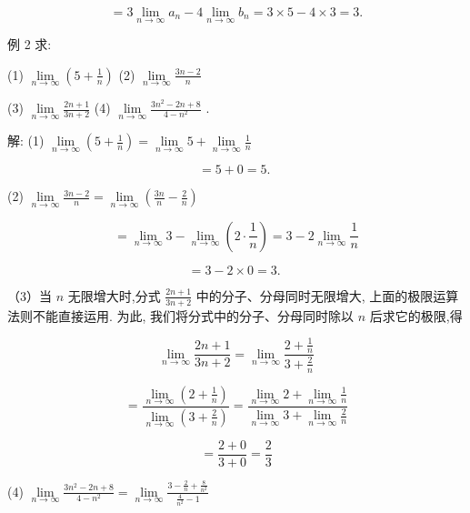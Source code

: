 \documentclass[lang=cn,newtx,10pt,scheme=chinese]{elegantbook}
\begin{document}
\[
= 3\mathop{\lim }\limits_{{n \rightarrow \infty }}{a}_{n} - 4\mathop{\lim }\limits_{{n \rightarrow \infty }}{b}_{n} = 3 \times 5 - 4 \times 3 = 3\text{.}
\]

例 2 求:

(1) \(\mathop{\lim }\limits_{{n \rightarrow \infty }}\left( {5 + \frac{1}{n}}\right)\) (2) \(\mathop{\lim }\limits_{{n \rightarrow \infty }}\frac{{3n} - 2}{n}\)

(3) \(\mathop{\lim }\limits_{{n \rightarrow \infty }}\frac{{2n} + 1}{{3n} + 2}\) (4) \(\mathop{\lim }\limits_{{n \rightarrow \infty }}\frac{3{n}^{2} - {2n} + 8}{4 - {n}^{2}}\) .

解: (1) \(\mathop{\lim }\limits_{{n \rightarrow \infty }}\left( {5 + \frac{1}{n}}\right) = \mathop{\lim }\limits_{{n \rightarrow \infty }}5 + \mathop{\lim }\limits_{{n \rightarrow \infty }}\frac{1}{n}\)

\[
= 5 + 0 = 5\text{. }
\]

(2) \(\mathop{\lim }\limits_{{n \rightarrow \infty }}\frac{{3n} - 2}{n} = \mathop{\lim }\limits_{{n \rightarrow \infty }}\left( {\frac{3n}{n} - \frac{2}{n}}\right)\)

\[
= \mathop{\lim }\limits_{{n \rightarrow \infty }}3 - \mathop{\lim }\limits_{{n \rightarrow \infty }}\left( {2 \cdot \frac{1}{n}}\right) = 3 - 2\mathop{\lim }\limits_{{n \rightarrow \infty }}\frac{1}{n}
\]

\[
= 3 - 2 \times 0 = 3\text{. }
\]

（3）当 \(n\) 无限增大时,分式 \(\frac{{2n} + 1}{{3n} + 2}\) 中的分子、分母同时无限增大, 上面的极限运算法则不能直接运用. 为此, 我们将分式中的分子、分母同时除以 \(n\) 后求它的极限,得

\[
\mathop{\lim }\limits_{{n \rightarrow \infty }}\frac{{2n} + 1}{{3n} + 2} = \mathop{\lim }\limits_{{n \rightarrow \infty }}\frac{2 + \frac{1}{n}}{3 + \frac{2}{n}}
\]

\[
= \frac{\mathop{\lim }\limits_{{n \rightarrow \infty }}\left( {2 + \frac{1}{n}}\right) }{\mathop{\lim }\limits_{{n \rightarrow \infty }}\left( {3 + \frac{2}{n}}\right) } = \frac{\mathop{\lim }\limits_{{n \rightarrow \infty }}2 + \mathop{\lim }\limits_{{n \rightarrow \infty }}\frac{1}{n}}{\mathop{\lim }\limits_{{n \rightarrow \infty }}3 + \mathop{\lim }\limits_{{n \rightarrow \infty }}\frac{2}{n}}
\]

\[
= \frac{2 + 0}{3 + 0} = \frac{2}{3}
\]

(4) \(\mathop{\lim }\limits_{{n \rightarrow \infty }}\frac{3{n}^{2} - {2n} + 8}{4 - {n}^{2}} = \mathop{\lim }\limits_{{n \rightarrow \infty }}\frac{3 - \frac{2}{n} + \frac{8}{{n}^{2}}}{\frac{4}{{n}^{2}} - 1}\)
\end{document}
